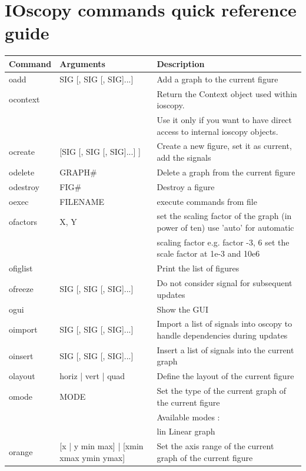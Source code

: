 \documentclass[a4paper,11pt]{report}
\begin{document}
\chapter{IOscopy commands quick reference guide}
\begin{landscape}
  \begin{table}[htbp]
    \centering\sf
    \begin{tabular}{lll}
      \hline
      Command & Arguments & Description \\
      \hline
      oadd & SIG [, SIG [, SIG]...] &Add a graph to the current figure\\
      ocontext& & Return the Context object used within ioscopy.\\
      & &Use it only if you want to have direct access to internal ioscopy objects.\\
      ocreate & [SIG [, SIG [, SIG]...] ]&Create a new figure, set it as current, add the signals\\
      odelete & GRAPH\# &Delete a graph from the current figure\\
      odestroy & FIG\# &Destroy a figure\\
      oexec & FILENAME &execute commands from file\\
      ofactors & X, Y &set the scaling factor of the graph (in power of ten)   use 'auto' for automatic\\
      & & scaling factor e.g. factor -3, 6 set the scale factor at 1e-3 and 10e6\\
      ofiglist & &Print the list of figures\\
      ofreeze & SIG [, SIG [, SIG]...] &Do not consider signal for subsequent updates\\
      ogui & & Show the GUI\\
      oimport& SIG [, SIG [, SIG]...] & Import a list of signals into oscopy to handle dependencies during updates\\
      oinsert & SIG [, SIG [, SIG]...] &Insert a list of signals into the current graph\\
      olayout & horiz | vert | quad&Define the layout of the current figure\\
      omode & MODE &Set the type of the current graph of the current figure\\
      & &Available modes :\\
      & & lin      Linear graph\\
      orange & [x | y min max] | [xmin xmax ymin ymax] &Set the axis range of the current graph of the current figure\\

\end{tabular}
\end{table}
\end{landscape}
\end{document}
